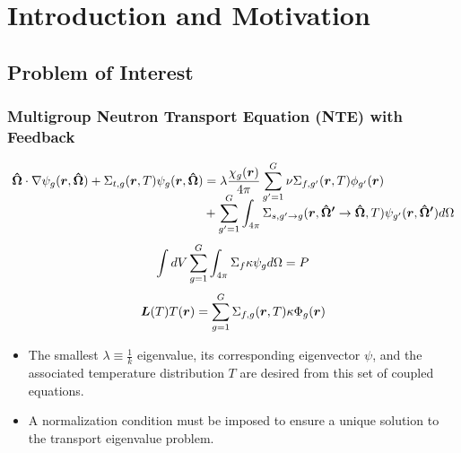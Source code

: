 \section{Introduction and Motivation}


\subsection{Problem of Interest}
\begin{frame}
	\frametitle{Multigroup Neutron Transport Equation (NTE) with Feedback}
	\vspace{-2em}
	\begin{equation}
	    \begin{aligned}
             \boldsymbol{\hat{\Omega}} \cdot \nabla\psi_g(\boldsymbol{r}, \boldsymbol{\hat{\Omega}} ) + \Sigma_{t,g}(\boldsymbol{r},T) \psi_g(\boldsymbol{r}, \boldsymbol{\hat{\Omega}} ) &=\lambda \frac{\chi_g(\boldsymbol{r})}{4\pi} \sum\limits_{g'=1}^G \nu \Sigma_{f,g'}(\boldsymbol{r},T) \phi_{g'}(\boldsymbol{r})\\[-11pt]
           &+ \sum\limits_{g'=1}^G \int_{4\pi}\Sigma_{s,g'\to g}(\boldsymbol{r},\boldsymbol{\hat{\Omega}'}\to \boldsymbol{\hat{\Omega}},T)  \psi_{g'}(\boldsymbol{r},\boldsymbol{\hat{\Omega}'}) d\Omega    \label{eqn:transport}
        \end{aligned}
    \end{equation}
    \vspace{-2em}
    \begin{equation}
        \int dV\sum\limits_{g=1}^G\int_{4\pi}\Sigma_f\kappa\psi_g d\Omega=P\label{eqn:normalization}
    \end{equation}
    \vspace{-2em}
    \begin{equation}
        \boldsymbol{L}(T)T(\boldsymbol{r})=\sum\limits_{g=1}^G\Sigma_{f,g}(\boldsymbol{r},T)\kappa\Phi_g(\boldsymbol{r})\label{eqn:th}
    \end{equation}
    \vspace{-2em}
	\begin{itemize}
	\item The smallest $\lambda \equiv \frac{1}{k}$ eigenvalue, its corresponding eigenvector $\psi$, and the associated temperature distribution $T$ are desired from this set of coupled equations.
	\vspace{-0.5em}
	\item A normalization condition must be imposed to ensure a unique solution to the transport eigenvalue problem.
	\vspace{-0.5em}
	\end{itemize}
	\vfill
\end{frame}
